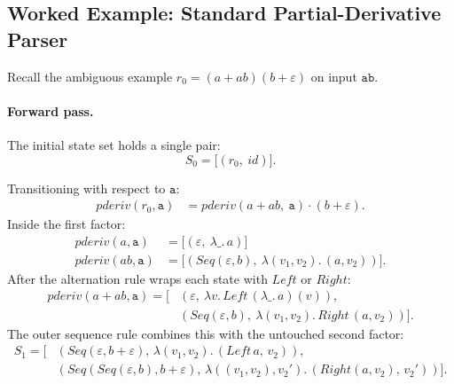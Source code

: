 %
%
%

\subsection{Worked Example: Standard Partial-Derivative Parser}
\label{sec:pderiv-std-worked}

Recall the ambiguous example $r_0 = (a + ab)(b + \varepsilon)$ 
on input $\mathtt{ab}$.

%

\paragraph{Forward pass.}
The initial state set holds a single pair:
\[
S_0 = \bigl[(r_0,\ \mathit{id})\bigr].
\]

Transitioning with respect to $\mathtt{a}$:
\[
\begin{aligned}
\mathit{pderiv}(r_0, \mathtt{a})
  &= \mathit{pderiv}(a + ab,\ \mathtt{a})
     \cdot (b + \varepsilon).
\end{aligned}
\]
Inside the first factor:
\[
\begin{aligned}
\mathit{pderiv}(a, \mathtt{a})
  &= \bigl[(\varepsilon,\ \lambda\_.\, a)\bigr] \\
\mathit{pderiv}(ab, \mathtt{a})
  &= \bigl[(\mathit{Seq}(\varepsilon, b),\ \lambda(v_1, v_2).\, (a, v_2))\bigr].
\end{aligned}
\]
After the alternation rule wraps each state with $\mathit{Left}$ 
or $\mathit{Right}$:
\[
\begin{aligned}
\mathit{pderiv}(a + ab, \mathtt{a})
  = \bigl[
    &(\varepsilon,\ \lambda v.\, \mathit{Left}\,(\lambda\_.\, a)(v)), \\
    &(\mathit{Seq}(\varepsilon, b),\ \lambda(v_1, v_2).\,
       \mathit{Right}\,(a, v_2))\bigr].
\end{aligned}
\]
The outer sequence rule combines this with the untouched second factor:
\[
\begin{aligned}
S_1
  = \bigl[
    &(\mathit{Seq}(\varepsilon, b + \varepsilon),\,
       \lambda(v_1, v_2).\, (\mathit{Left}\,a,\, v_2)), \\
    &(\mathit{Seq}(\mathit{Seq}(\varepsilon, b), b + \varepsilon),\,
       \lambda((v_1, v_2), v_2').\, (\mathit{Right}(a, v_2),\, v_2'))\bigr].
\end{aligned}
\]

